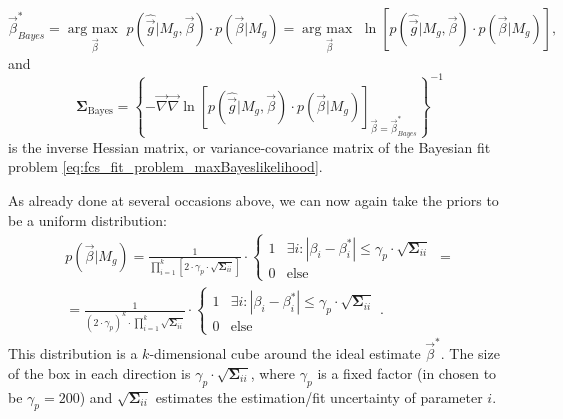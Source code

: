 \documentclass[a4paper,notitlepage]{article}
\DeclareMathOperator*{\argmax}{arg\:max\ }
\newcommand{\mat}[1]{\mathrm{\mathbf{#1}}}
\begin{document}
\begin{equation}\label{eq:fcs_fit_problem_maxBayeslikelihood}
  \vec{\beta}_{Bayes}^\ast=\argmax\limits_{\vec{\beta}}p(\hat{\vec{g}}|M_g,\vec{\beta})\cdot p(\vec{\beta}|M_g)=\argmax\limits_{\vec{\beta}}\ln\left[p(\hat{\vec{g}}|M_g,\vec{\beta})\cdot p(\vec{\beta}|M_g)\right],
\end{equation}
and 
\begin{equation}\label{eq:fcs_fit_problem_invbayeshessian}
  \mat{\Sigma}_\text{Bayes}=\left\{-\vec{\nabla}\vec{\nabla}\ln\left[p(\hat{\vec{g}}|M_g,\vec{\beta})\cdot p(\vec{\beta}|M_g)\right]_{\vec{\beta}=\vec{\beta}_{Bayes}^\ast}\right\}^{-1}
\end{equation}
is the inverse Hessian matrix, or variance-covariance matrix of the Bayesian fit problem \eqref{eq:fcs_fit_problem_maxBayeslikelihood}. 

As already done at several occasions above, we can now again take the priors to be a uniform distribution:
\begin{multline}\label{eq:fcs_fit_bayes_flatparamprior}
  p(\vec{\beta}|M_g)=\frac{1}{\prod_{i=1}^k\left[2\cdot \gamma_p\cdot\sqrt{\mat{\Sigma}_{ii}}\right]}\cdot\begin{cases}1&\exists i: |\beta_i-\beta_i^\ast|\leq \gamma_p\cdot\sqrt{\mat{\Sigma}_{ii}}\\0&\text{else}\end{cases}=\\
	=\frac{1}{(2\cdot \gamma_p)^k\cdot\prod_{i=1}^k\sqrt{\mat{\Sigma}_{ii}}}\cdot\begin{cases}1&\exists i: |\beta_i-\beta_i^\ast|\leq \gamma_p\cdot\sqrt{\mat{\Sigma}_{ii}}\\0&\text{else}\end{cases}.
\end{multline}
This distribution is a $k$-dimensional cube around the ideal estimate $\vec{\beta}^\ast$. The size of the box in each direction is $\gamma_p\cdot\sqrt{\mat{\Sigma}_{ii}}$, where $\gamma_p$ is a fixed factor (in \cite{GUO2012} chosen to be $\gamma_p=200$) and $\sqrt{\mat{\Sigma}_{ii}}$ estimates the estimation/fit uncertainty of parameter $i$.
\end{document}
